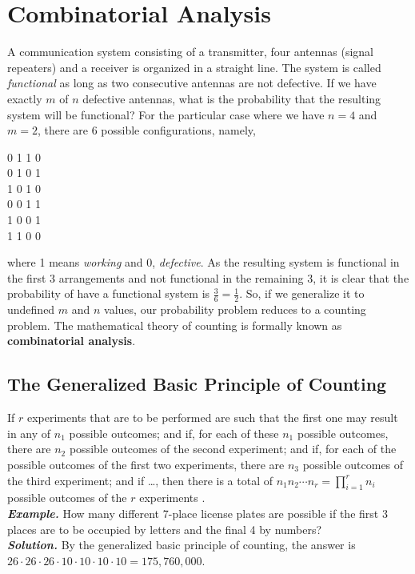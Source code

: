 \documentclass[a4paper,twocolumn]{article}
\begin{document}
\section{Combinatorial Analysis}

A communication system consisting of a transmitter, four antennas (signal repeaters) and a receiver is organized in a straight line. The system is called \textit{functional} as long as two consecutive antennas are not defective. If we have exactly $m$ of $n$ defective antennas, what is the probability that the resulting system will be functional? For the particular case where we have $n = 4$ and $m = 2$, there are 6 possible configurations, namely,

\begin{center}
0 1 1 0\\
0 1 0 1\\
1 0 1 0\\
0 0 1 1\\
1 0 0 1\\
1 1 0 0
\end{center}

\noindent where 1 means \textit{working} and 0, \textit{defective}. As the resulting system is functional in the first 3 arrangements and not functional in the remaining 3, it is clear that the probability of have a functional system is $\frac{3}{6} = \frac{1}{2}$. So, if we generalize it to undefined $m$ and $n$ values, our probability problem reduces to a counting problem. The mathematical theory of counting is formally known as \textbf{combinatorial analysis}.


\subsection{The Generalized Basic Principle of Counting}

If $r$ experiments that are to be performed are such that the first one may result in any of $n_1$ possible outcomes; and if, for each of these $n_1$ possible outcomes, there are $n_2$ possible outcomes of the second experiment; and if, for each of the possible outcomes of the first two experiments, there are $n_3$ possible outcomes of the third experiment; and if \dots , then there is a total of $n_1 n_2 \dotsm n_r = \prod_{i=1}^{r} n_i$ possible outcomes of the $r$ experiments \cite{ross}.\\

\noindent\textbf{\textit{Example.}} How many different 7-place license plates are possible if the first 3 places are to be occupied by letters and the final 4 by numbers?\\
\noindent\textbf{\textit{Solution.}} By the generalized basic principle of counting, the answer is $26 \cdot 26 \cdot 26 \cdot 10 \cdot 10 \cdot 10 \cdot 10 = 175,760,000$.
\end{document}
